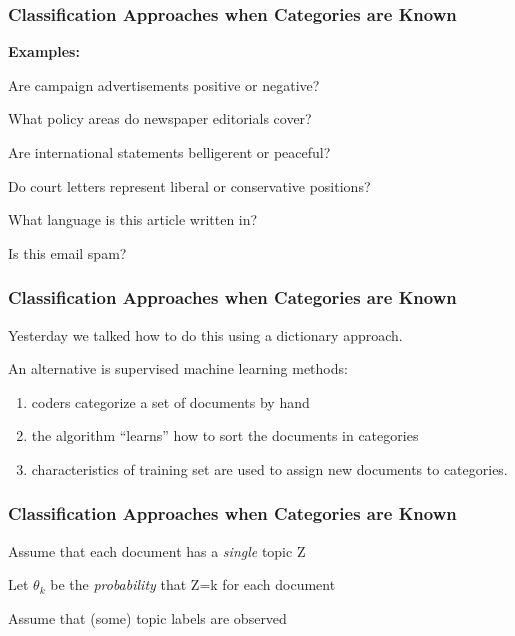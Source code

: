 \documentclass[11pt,compress,professionalfonts]{beamer}
\begin{document}
\begin{frame}[t,fragile]\frametitle{Classification Approaches when Categories are Known}

{\bf Examples:}

Are campaign advertisements positive or negative?

What  policy areas do newspaper editorials cover?

Are international statements belligerent or peaceful?

Do court letters represent liberal or conservative positions?

What language is this article written in?

Is this email spam?

\end{frame}
\begin{frame}[t,fragile]\frametitle{Classification Approaches when Categories are Known}

Yesterday we talked how to do this using a dictionary approach.

An alternative is supervised machine learning methods:
\begin{enumerate}

\item coders categorize a set of documents by hand
\item the algorithm ``learns'' how to sort the documents in categories
\item  characteristics of training set are used  to assign new documents to categories.
\end{enumerate}


\end{frame}
\begin{frame}[t,fragile]\frametitle{Classification Approaches when Categories are Known}

Assume that each document has a \textit{single} topic Z

Let $\theta_k$ be the \textit{probability} that Z=k for each document

Assume that (some) topic labels are observed







\end{frame}
\end{document}
